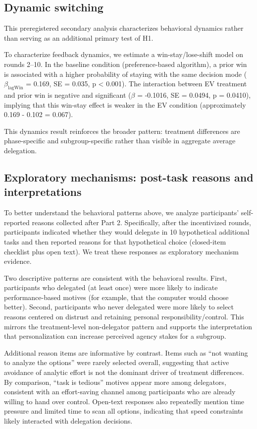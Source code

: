 \documentclass[a4paper, 12pt, fleqn]{article}
\theoremstyle{definition}
\begin{document}
\subsection{Dynamic switching}
This preregistered secondary analysis characterizes behavioral dynamics rather than serving as an additional primary test of H1.

To characterize feedback dynamics, we estimate a win-stay/lose-shift model on rounds 2--10. In the baseline condition (preference-based algorithm), a prior win is associated with a higher probability of staying with the same decision mode (\(\beta_{\text{lagWin}}\) = 0.169, SE = 0.035, p < 0.001). The interaction between EV treatment and prior win is negative and significant ($\beta$ = -0.1016, SE = 0.0494, p = 0.0410), implying that this win-stay effect is weaker in the EV condition (approximately 0.169 - 0.102 = 0.067).

This dynamics result reinforces the broader pattern: treatment differences are phase-specific and subgroup-specific rather than visible in aggregate average delegation.

\subsection{Exploratory mechanisms: post-task reasons and interpretations}
\label{sec:exploratory_mechanisms}
To better understand the behavioral patterns above, we analyze participants' self-reported reasons collected after Part 2. Specifically, after the incentivized rounds, participants indicated whether they would delegate in 10 hypothetical additional tasks and then reported reasons for that hypothetical choice (closed-item checklist plus open text). We treat these responses as exploratory mechanism evidence.

Two descriptive patterns are consistent with the behavioral results. First, participants who delegated (at least once) were more likely to indicate performance-based motives (for example, that the computer would choose better). Second, participants who never delegated were more likely to select reasons centered on distrust and retaining personal responsibility/control. This mirrors the treatment-level non-delegator pattern and supports the interpretation that personalization can increase perceived agency stakes for a subgroup.

Additional reason items are informative by contrast. Items such as ``not wanting to analyze the options'' were rarely selected overall, suggesting that active avoidance of analytic effort is not the dominant driver of treatment differences. By comparison, ``task is tedious'' motives appear more among delegators, consistent with an effort-saving channel among participants who are already willing to hand over control. Open-text responses also repeatedly mention time pressure and limited time to scan all options, indicating that speed constraints likely interacted with delegation decisions.
\end{document}
